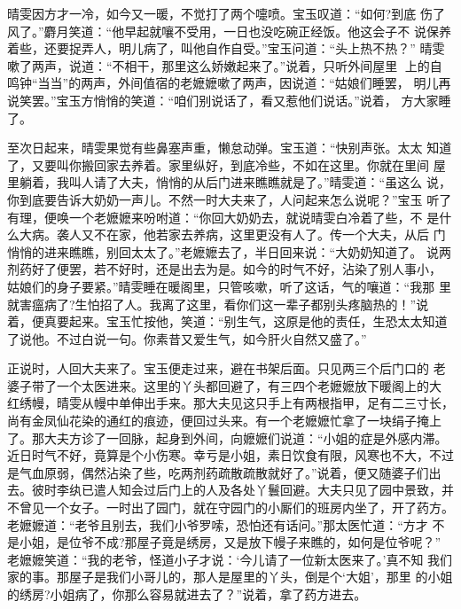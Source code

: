 晴雯因方才一冷，如今又一暖，不觉打了两个嚏喷。宝玉叹道：“如何?到底
伤了风了。”麝月笑道：“他早起就嚷不受用，一日也没吃碗正经饭。他这会子不
说保养着些，还要捉弄人，明儿病了，叫他自作自受。”宝玉问道：“头上热不热？”
晴雯嗽了两声，说道：“不相干，那里这么娇嫩起来了。”说着，只听外间屋里
上的自鸣钟“当当”的两声，外间值宿的老嬷嬷嗽了两声，因说道：“姑娘们睡罢，
明儿再说笑罢。”宝玉方悄悄的笑道：“咱们别说话了，看又惹他们说话。”说着，
方大家睡了。

至次日起来，晴雯果觉有些鼻塞声重，懒怠动弹。宝玉道：“快别声张。太太
知道了，又要叫你搬回家去养着。家里纵好，到底冷些，不如在这里。你就在里间
屋里躺着，我叫人请了大夫，悄悄的从后门进来瞧瞧就是了。”晴雯道：“虽这么
说，你到底要告诉大奶奶一声儿。不然一时大夫来了，人问起来怎么说呢？”宝玉
听了有理，便唤一个老嬷嬷来吩咐道：“你回大奶奶去，就说晴雯白冷着了些，不
是什么大病。袭人又不在家，他若家去养病，这里更没有人了。传一个大夫，从后
门悄悄的进来瞧瞧，别回太太了。”老嬷嬷去了，半日回来说：“大奶奶知道了。
说两剂药好了便罢，若不好时，还是出去为是。如今的时气不好，沾染了别人事小，
姑娘们的身子要紧。”晴雯睡在暖阁里，只管咳嗽，听了这话，气的嚷道：“我那
里就害瘟病了?生怕招了人。我离了这里，看你们这一辈子都别头疼脑热的！”说
着，便真要起来。宝玉忙按他，笑道：“别生气，这原是他的责任，生恐太太知道
了说他。不过白说一句。你素昔又爱生气，如今肝火自然又盛了。”

正说时，人回大夫来了。宝玉便走过来，避在书架后面。只见两三个后门口的
老婆子带了一个太医进来。这里的丫头都回避了，有三四个老嬷嬷放下暖阁上的大
红绣幔，晴雯从幔中单伸出手来。那大夫见这只手上有两根指甲，足有二三寸长，
尚有金凤仙花染的通红的痕迹，便回过头来。有一个老嬷嬷忙拿了一块绢子掩上
了。那大夫方诊了一回脉，起身到外间，向嬷嬷们说道：“小姐的症是外感内滞。
近日时气不好，竟算是个小伤寒。幸亏是小姐，素日饮食有限，风寒也不大，不过
是气血原弱，偶然沾染了些，吃两剂药疏散疏散就好了。”说着，便又随婆子们出
去。彼时李纨已遣人知会过后门上的人及各处丫鬟回避。大夫只见了园中景致，并
不曾见一个女子。一时出了园门，就在守园门的小厮们的班房内坐了，开了药方。
老嬷嬷道：“老爷且别去，我们小爷罗嗦，恐怕还有话问。”那太医忙道：“方才
不是小姐，是位爷不成?那屋子竟是绣房，又是放下幔子来瞧的，如何是位爷呢？”
老嬷嬷笑道：“我的老爷，怪道小子才说：‘今儿请了一位新太医来了。’真不知
我们家的事。那屋子是我们小哥儿的，那人是屋里的丫头，倒是个‘大姐’，那里
的小姐的绣房?小姐病了，你那么容易就进去了？”说着，拿了药方进去。

